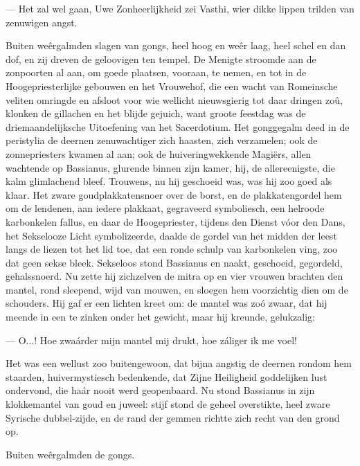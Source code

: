 \documentclass[a4paper, 12pt, oneside, dutch]{article}
\begin{document}
--- Het zal wel gaan, Uwe Zonheerlijkheid zei Vasthi, wier dikke lippen trilden van zenuwigen angst.

Buiten weêrgalmden slagen van gongs, heel hoog en weêr laag, heel schel en dan dof, en zij dreven de geloovigen ten tempel. De Menigte stroomde aan de zonpoorten al aan, om goede plaatsen, vooraan, te nemen, en tot in de Hoogepriesterlijke gebouwen en het Vrouwehof, die een wacht van Romeinsche veliten omringde en afsloot voor wie wellicht nieuwsgierig tot daar dringen zoû, klonken de gillachen en het blijde gejuich, want groote feestdag was de driemaandelijksche Uitoefening van het Sacerdotium. Het gonggegalm deed in de peristylia de deernen zenuwachtiger zich haasten, zich verzamelen; ook de zonnepriesters kwamen al aan; ook de huiveringwekkende Magiërs, allen wachtende op Bassianus, glurende binnen zijn kamer, hij, de allereenigste, die kalm glimlachend bleef. Trouwens, nu hij geschoeid was, was hij zoo goed als klaar. Het zware goudplakkatensnoer over de borst, en de plakkatengordel hem om de lendenen, aan iedere plakkaat, gegraveerd symboliesch, een helroode karbonkelen fallus, en daar de Hoogepriester, tijdens den Dienst vóor den Dans, het Sekselooze Licht symbolizeerde, daalde de gordel van het midden der leest langs de liezen tot het lid toe, dat een ronde schulp van karbonkelen ving, zoo dat geen sekse bleek. Sekseloos stond Bassianus en naakt, geschoeid, gegordeld, gehalssnoerd. Nu zette hij zichzelven de mitra op en vier vrouwen brachten den mantel, rond sleepend, wijd van mouwen, en sloegen hem voorzichtig dien om de schouders. Hij gaf er een lichten kreet om: de mantel was zoó zwaar, dat hij meende in een te zinken onder het gewicht, maar hij kreunde, gelukzalig:

--- O...! Hoe zwaárder mijn mantel mij drukt, hoe záliger ik me voel!

Het was een wellust zoo buitengewoon, dat bijna angstig de deernen rondom hem staarden, huivermystiesch bedenkende, dat Zijne Heiligheid goddelijken lust ondervond, die haár nooit werd geopenbaard. Nu stond Bassianus in zijn klokkemantel van goud en juweel: stijf stond de geheel overstikte, heel zware Syrische dubbel-zijde, en de rand der gemmen richtte zich recht van den grond op.

Buiten weêrgalmden de gongs.
\end{document}
